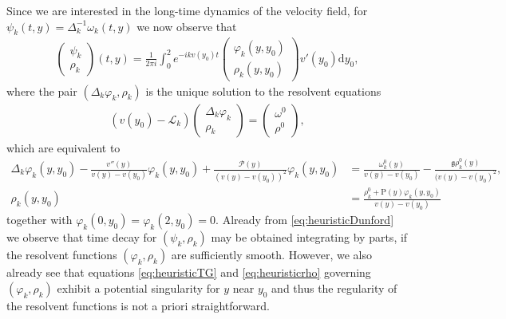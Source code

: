 \documentclass[11pt,reqno]{amsproc}
\theoremstyle{definition}
\numberwithin{equation}{section}
\renewcommand{\L}{{\mathcal{L}}}
\renewcommand{\d}{\mathrm{d}}
\newcommand{\g}{{\mathfrak{g}}}
\renewcommand{\P}{{\mathcal{P}}}
\begin{document}
Since we are interested in the long-time dynamics of the velocity field, for $\psi_k(t,y) = \Delta_k^{-1}\omega_k(t,y)$ we now observe that
\begin{align}\label{eq:heuristicDunford}
\begin{pmatrix}
\psi_k \\ \rho_k
\end{pmatrix}(t,y) = \frac{1}{2\pi i}\int_0^2 e^{- ikv(y_0) t}  \begin{pmatrix}
\varphi_k(y,y_0) \\ \rho_k(y,y_0) 
\end{pmatrix} v'(y_0) \d y_0,
\end{align}
where the pair $(\Delta_k\varphi_k, \rho_k)$ is the unique solution to the resolvent equations
\begin{align*}
(v(y_0) - \L_k) \begin{pmatrix}
\Delta_k\varphi_k \\ \rho_k
\end{pmatrix} = \begin{pmatrix}
\omega^0 \\ \rho^0
\end{pmatrix},
\end{align*}
which are equivalent to
\begin{align}
\Delta_k \varphi_k(y,y_0) - \frac{v''(y)}{v(y) - v(y_0)}\varphi_k(y,y_0) + \frac{\P(y)}{(v(y) - v(y_0))^2}\varphi_k(y,y_0) &= \frac{\omega_k^0(y)}{v(y) - v(y_0)} - \frac{\g \rho_k^0(y)}{(v(y) - v(y_0)^2}, \label{eq:heuristicTG}\\
\rho_k(y,y_0) &= \frac{\rho_k^0 + \mathrm{P}(y) \varphi_k(y,y_0)}{v(y) - v(y_0)} \label{eq:heuristicrho}
\end{align}
together with $\varphi_k(0,y_0) = \varphi_k(2,y_0) = 0$. Already from \eqref{eq:heuristicDunford} we observe that time decay for $(\psi_k, \rho_k)$ may be obtained integrating by parts, if the resolvent functions $(\varphi_k,\rho_k)$ are sufficiently smooth. However, we also already see that equations \eqref{eq:heuristicTG} and \eqref{eq:heuristicrho} governing $(\varphi_k,\rho_k)$ exhibit a potential singularity for $y$ near $y_0$ and thus the regularity of the resolvent functions is not a priori straightforward.
\end{document}
